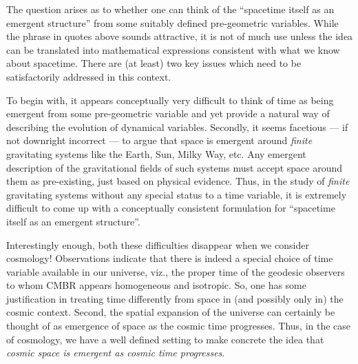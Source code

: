 \documentclass[aps,prd,showpacs,nofootinbib,floats,floatfix,preprintnumbers,groupedaddress,twocolumn]{revtex4}
\begin{document}
The question arises as to whether one can think of the ``spacetime itself as an emergent structure'' from some suitably defined pre-geometric variables.  While the phrase in quotes above sounds attractive, it is not of much use unless the idea can be translated into mathematical  expressions consistent with what we know about spacetime. 
There are (at least) two key issues which need to be satisfactorily addressed in this context.


To begin with, 
it appears conceptually very difficult to think of time as being emergent from some pre-geometric variable and yet provide a natural way of describing the evolution of dynamical variables. Secondly, it seems facetious  --- if not downright incorrect --- to argue that space is emergent around  \textit{finite} gravitating systems like the Earth, Sun, Milky Way, etc. Any emergent description of the gravitational fields of such systems must accept space around them as pre-existing, just based on physical evidence. Thus, in the study of \textit{finite} gravitating systems without any special status to a time variable, it is extremely difficult to come up with a conceptually consistent formulation for ``spacetime itself as an emergent structure''.

Interestingly enough, both these difficulties disappear when we consider cosmology! Observations indicate that there is indeed a special choice of time variable available in our universe, viz., the proper time of the geodesic observers to whom CMBR appears homogeneous and isotropic. So, one has some justification in treating time differently from space in (and possibly only in) the cosmic context. Second, the spatial expansion of the universe can certainly be thought of as emergence of space as the cosmic time progresses. Thus, in the case of cosmology, we have a well defined setting to make concrete the idea that \textit{cosmic space is emergent as cosmic time progresses}.  
\end{document}
